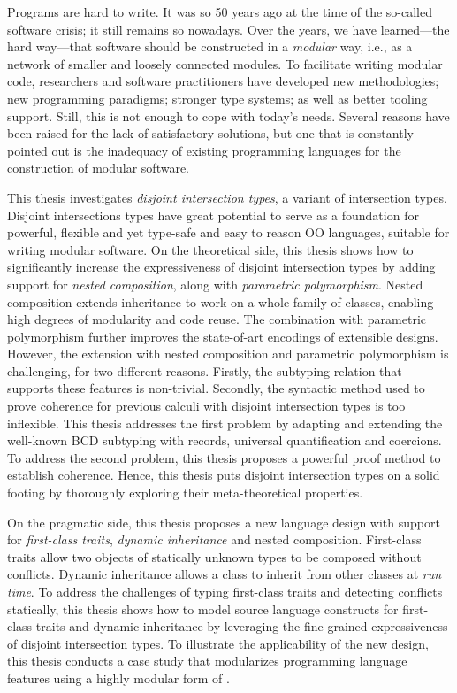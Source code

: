 %
\noindent
%
Programs are hard to write. It was so 50 years ago at the time of the so-called
software crisis; it still remains so nowadays. Over the years, we have
learned---the hard way---that software should be constructed in a
\emph{modular} way, i.e., as a network of smaller and loosely connected
modules. To facilitate writing modular code, researchers and software
practitioners have developed new methodologies; new programming paradigms;
stronger type systems; as well as better tooling support. Still, this is not
enough to cope with today's needs. Several reasons have been raised for the lack
of satisfactory solutions, but one that is constantly pointed out is the
inadequacy of existing programming languages for the construction of
modular software.

This thesis investigates \emph{disjoint intersection types}, a variant of
intersection types. Disjoint intersections types have great potential to serve
as a foundation for powerful, flexible and yet type-safe and easy to reason OO
languages, suitable for writing modular software. On the theoretical side, this
thesis shows how to significantly increase the expressiveness of disjoint
intersection types by adding support for \emph{nested composition}, along with
\emph{parametric polymorphism}. Nested composition extends inheritance to work
on a whole family of classes, enabling high degrees of modularity and code
reuse. The combination with parametric polymorphism further improves the
state-of-art encodings of extensible designs. However, the extension with nested
composition and parametric polymorphism is challenging, for two different
reasons. Firstly, the subtyping relation that supports these features is
non-trivial. Secondly, the syntactic method used to prove coherence for previous
calculi with disjoint intersection types is too inflexible. This thesis
addresses the first problem by adapting and extending the well-known BCD
subtyping with records, universal quantification and coercions. To address the
second problem, this thesis proposes a powerful proof method to establish
coherence. Hence, this thesis puts disjoint intersection types on a solid
footing by thoroughly exploring their meta-theoretical properties.

On the pragmatic side, this thesis proposes a new language design with support
for \emph{first-class traits}, \emph{dynamic inheritance} and nested
composition. First-class traits allow two objects of statically unknown types
to be composed without conflicts. Dynamic inheritance allows a class to inherit
from other classes at \emph{run time}. To address the challenges of typing
first-class traits and detecting conflicts statically, this thesis shows how to
model source language constructs for first-class traits and dynamic inheritance
by leveraging the fine-grained expressiveness of disjoint intersection types. To
illustrate the applicability of the new design, this thesis conducts a case
study that modularizes programming language features using a highly modular form
of \visitor.

